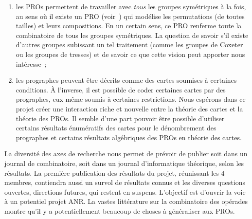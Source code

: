 \documentclass[10pt,reqno]{amsart}
\numberwithin{equation}{subsection}
\begin{document}
\begin{enumerate}[fullwidth,label={\bf (\arabic*)}]
    \item \label{item:objectif_groupes}
    les PROs permettent de travailler avec {\em tous} les groupes 
    symétriques à la fois, au sens où il existe un PRO 
    (voir~\cite{Laf03,Laf13}) qui modélise les permutations (de toutes 
    tailles) et leurs compositions. En un certain sens, ce PRO renferme
    toute la combinatoire de tous  les groupes symétriques. La question 
    de savoir s'il existe d'autres groupes subissant un tel traitement
    (comme les groupes de Coxeter ou les groupes de tresses) et de 
    savoir ce que cette vision peut apporter nous intéresse~;
    
    \item \label{item:objectif_cartes}
    les prographes peuvent être décrits comme des cartes soumises à 
    certaines conditions. À l'inverse, il est possible de coder certaines
    cartes par des prographes, eux-même soumis à certaines restrictions.
    Nous espérons dans ce projet créer une interaction riche et nouvelle 
    entre la théorie des cartes et la théorie des PROs. Il semble d'une 
    part pouvoir être possible d'utiliser certains résultats énumératifs 
    des cartes pour le dénombrement des prographes et certains résultats 
    algébriques des PROs en théorie des cartes.
\end{enumerate}



La diversité des axes de recherche nous permet de prévoir de publier soit
dans un journal de combinatoire, soit dans un journal d'informatique théorique,
selon les résultats. La première publication des résultats du projet, réunissant
les 4 membres, contiendra aussi un survol de résultats connus et les diverses 
questions ouvertes, directions futures, qui restent en suspens. L'objectif est 
d'ouvrir la voie à un potentiel projet ANR. La vastes littérature sur la combinatoire
des opérades montre qu'il y a potentiellement beaucoup de choses à généraliser aux PROs.


\end{document}
